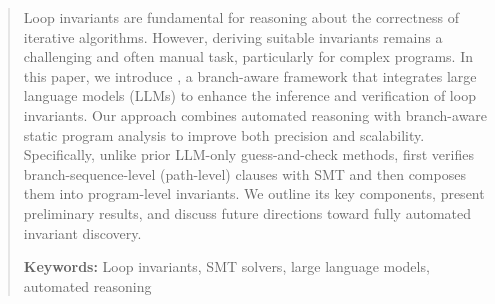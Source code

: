 \begin{abstract}
Loop invariants are fundamental for reasoning about the correctness of iterative algorithms. However, deriving suitable invariants remains a challenging and often manual task, particularly for complex programs. In this paper, we introduce \textsc{\thistool}, a branch-aware framework that integrates large language models (LLMs) to enhance the inference and verification of loop invariants. Our approach combines automated reasoning with branch-aware static program analysis to improve both precision and scalability. Specifically, unlike prior LLM-only guess-and-check methods, \textsc{\thistool} first verifies branch-sequence-level (path-level) clauses with SMT and then composes them into program-level invariants. We outline its key components, present preliminary results, and discuss future directions toward fully automated invariant discovery.

\noindent\textbf{Keywords:} Loop invariants, SMT solvers, large language models, automated reasoning
\end{abstract}


